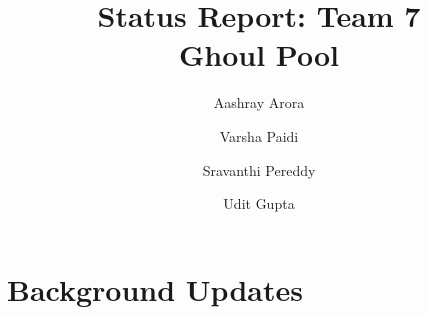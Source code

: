 \documentclass[runningheads]{llncs}
\newcommand{\keywords}[1]{\par\addvspace\baselineskip
\noindent\keywordname\enspace\ignorespaces#1}
\newcommand{\swallow}[1]{ }
\begin{document}
\mainmatter  %

\title{Status Report: Team 7\\
Ghoul Pool}


%
%
\author{Aashray Arora \and Varsha Paidi \and Sravanthi Pereddy\and Udit Gupta}
%


%
%

\maketitle

\swallow{   %
\begin{abstract}
The abstract should summarize the contents of the paper and should
contain at least 70 and at most 150 words. It should be written using the
\emph{abstract} environment.
\keywords{We would like to encourage you to list your keywords within
the abstract section}
\end{abstract}
}


\section{Background Updates} 
\end{document}
